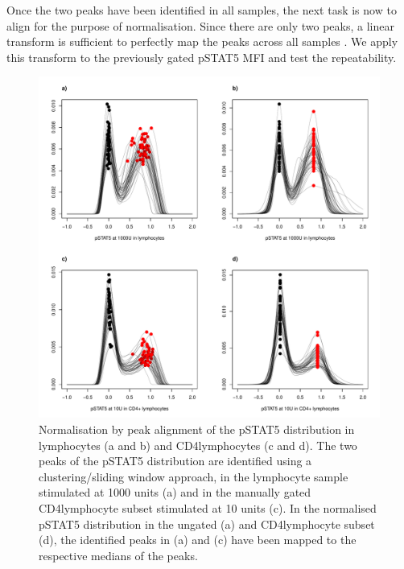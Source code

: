 Once the two peaks have been identified in all samples, the next task is now to align for the purpose of normalisation.
Since there are only two peaks, a linear transform is sufficient to perfectly map the peaks across all samples .
We apply this transform to the previously gated pSTAT5 MFI and test the repeatability.



\begin{figure}[h]
    \centering
    \includegraphics[scale=.5]{IL2/figures/pstat5-peak-normalisation.pdf}
    {Normalisation by peak alignment of the pSTAT5 distribution in lymphocytes (a and b) and CD4\positive lymphocytes (c and d).}
    {
      The two peaks of the pSTAT5 distribution are identified using a clustering/sliding window approach,
      in the lymphocyte sample stimulated at 1000 units (a) and in the manually gated CD4\positive lymphocyte subset stimulated at 10 units (c).
      In the normalised pSTAT5 distribution in the ungated (a) and CD4\positive lymphocyte subset (d),
      the identified peaks in (a) and (c) have been mapped to the respective medians of the peaks.
    }
\end{figure}


